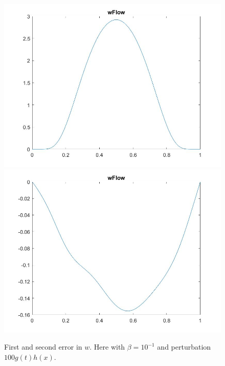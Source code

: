 \documentclass[11pt, a4paper]{article}
\theoremstyle{definition}
\begin{document}
\begin{figure}[h]
	\includegraphics[scale=0.3]{wPertyt5.jpg}
	\includegraphics[scale=0.3]{wPertyt6.jpg}
	\caption{First and second error in $w$. Here with $\beta =10^{-1}$ and perturbation $100g(t)h(x)$.}
	\label{Figgh3}
\end{figure}
\end{document}
